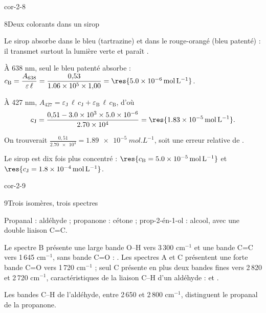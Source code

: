 \begin{blocLivre}{cor-2-8}
\begin{corrige}{8}{Deux colorants dans un sirop}
\begin{questions}
\item Le sirop absorbe dans le bleu (tartrazine) et dans le rouge-orangé (bleu patenté) : il transmet surtout la
lumière verte et paraît .
\item À 638 nm, seul le bleu patenté absorbe :
$c_\mathrm{B}=\dfrac{A_{638}}{\varepsilon\,\ell}=\dfrac{0{,}53}{\num{1.06e5}\times1{,}00}=\res{\qty{5,0e-6}{mol.L^{-1}}}$.
\item À 427 nm, $A_{427}=\varepsilon_\mathrm{J}\,\ell\,c_\mathrm{J}+\varepsilon_\mathrm{B}\,\ell\,c_\mathrm{B}$, d'où
\[c_\mathrm{J}=\frac{0{,}51-\num{3.0e3}\times\num{5.0e-6}}{\num{2.70e4}}=\res{\qty{1,83e-5}{mol.L^{-1}}}.\]
\item On trouverait $\frac{0{,}51}{\num{2.70e4}}=\qty{1,89e-5}{mol.L^{-1}}$, soit une erreur relative de .
\item Le sirop est dix fois plus concentré : $\res{c_\mathrm{B}=\qty{5,0e-5}{mol.L^{-1}}}$ et
$\res{c_\mathrm{J}=\qty{1,8e-4}{mol.L^{-1}}}$.
\end{questions}
\end{corrige}
\end{blocLivre}
\begin{blocLivre}{cor-2-9}
\begin{corrige}{9}{Trois isomères, trois spectres}
\begin{questions}
\item Propanal  : aldéhyde ; propanone  : cétone ;
prop-2-én-1-ol  : alcool, avec une double liaison C=C.
\item Le spectre B présente une large bande O--H vers 3\,300 cm$^{-1}$ et une bande C=C vers 1\,645 cm$^{-1}$, sans
bande C=O : . Les spectres A et C présentent une forte bande C=O vers
1\,720 cm$^{-1}$ ; seul C présente en plus deux bandes fines vers 2\,820 et 2\,720 cm$^{-1}$, caractéristiques de la
liaison C--H d'un aldéhyde :  et .
\item Les bandes C--H de l'aldéhyde, entre 2\,650 et 2\,800 cm$^{-1}$, distinguent le propanal de la propanone.
\end{questions}
\end{corrige}
\end{blocLivre}

